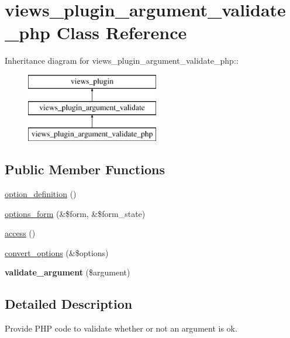 \hypertarget{classviews__plugin__argument__validate__php}{
\section{views\_\-plugin\_\-argument\_\-validate\_\-php Class Reference}
\label{classviews__plugin__argument__validate__php}
}
Inheritance diagram for views\_\-plugin\_\-argument\_\-validate\_\-php::\begin{figure}[H]
\begin{center}
\leavevmode
\includegraphics[height=3cm]{classviews__plugin__argument__validate__php}
\end{center}
\end{figure}
\subsection*{Public Member Functions}
\begin{DoxyCompactItemize}
\item 
\hyperlink{classviews__plugin__argument__validate__php_ac6bdb38c1985c81cc4cf6d5aac948378}{option\_\-definition} ()
\item 
\hyperlink{classviews__plugin__argument__validate__php_a150a440c5cdcbad02d6cbd5916f9f0b7}{options\_\-form} (\&\$form, \&\$form\_\-state)
\item 
\hyperlink{classviews__plugin__argument__validate__php_a11100ee9f3e1d9ec27f3f1b151994d1c}{access} ()
\item 
\hyperlink{classviews__plugin__argument__validate__php_a8e9620b1e226ad96a2796a313583bafe}{convert\_\-options} (\&\$options)
\item 
\hypertarget{classviews__plugin__argument__validate__php_a0edabb29fabfd718ca1000eb158ef580}{
{\bfseries validate\_\-argument} (\$argument)}
\label{classviews__plugin__argument__validate__php_a0edabb29fabfd718ca1000eb158ef580}

\end{DoxyCompactItemize}


\subsection{Detailed Description}
Provide PHP code to validate whether or not an argument is ok. 

